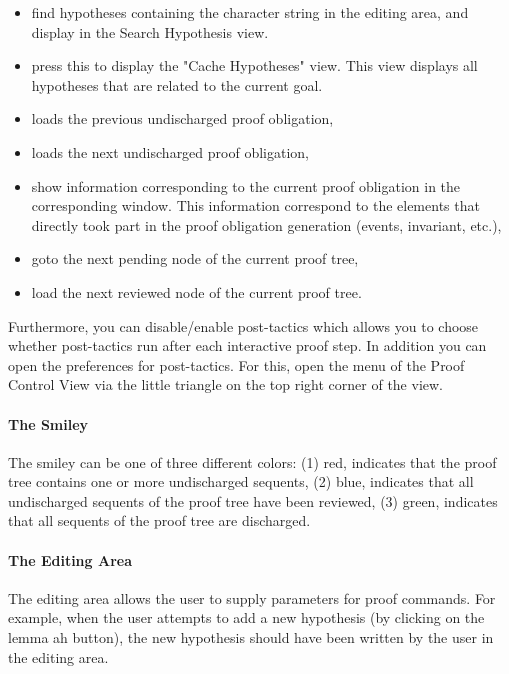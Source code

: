 \begin{itemize}
    \item {} find hypotheses containing the character string in the editing area, and display in the Search Hypothesis view.
    \item {} press this to display the "Cache Hypotheses" view. This view displays all hypotheses that are related to the current goal.
    \item {} loads the previous undischarged proof obligation,
    \item {} loads the next undischarged proof obligation,
    \item {} show information corresponding to the current proof obligation in the corresponding window. This information correspond to the elements that directly took part in the proof obligation generation (events, invariant, etc.),
    \item {} goto the next pending node of the current proof tree,
    \item {} load the next reviewed node of the current proof tree.
\end{itemize}

Furthermore, you can disable/enable post-tactics which allows you to choose whether post-tactics run after each interactive proof step. In addition you can open the preferences for post-tactics. For this, open the menu of the \textsf{Proof Control View} via the little triangle on the top right corner of the view.

\paragraph{The Smiley}

The smiley can be one of three different colors: (1) red, indicates that the proof tree contains one or more undischarged sequents, (2) blue, indicates that all undischarged sequents of the proof tree have been reviewed, (3) green, indicates that all sequents of the proof tree are discharged.

\paragraph{The Editing Area}

The editing area allows the user to supply parameters for proof commands. For example, when the user attempts to add a new hypothesis (by clicking on the lemma ah button), the new hypothesis should have been written by the user in the editing area.

